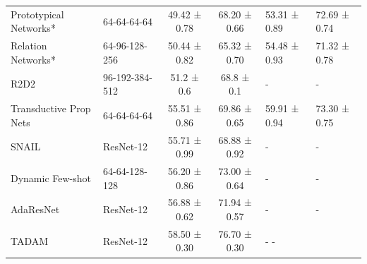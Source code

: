 \begin{table}[htbp]
{\begin{tabular}{
    l 
    l 
    c 
    c 
    l 
    l }
    Prototypical Networks*                           & 64-64-64-64                       & 49.42 ± 0.78                                                      & 68.20 ± 0.66                                                      & 53.31 ± 0.89                                                & 72.69 ± 0.74                                                \\
    Relation Networks*                               & 64-96-128-256                     & 50.44 ± 0.82                                                      & 65.32 ± 0.70                                                      & 54.48 ± 0.93                                                & 71.32 ± 0.78                                                \\
    R2D2                                             & 96-192-384-512                    & 51.2 ± 0.6                                                        & 68.8 ± 0.1                                                        & -                                   & -                                   \\
    Transductive Prop Nets                           & 64-64-64-64                       & 55.51 ± 0.86                                                      & 69.86 ± 0.65                                                      & 59.91 ± 0.94                                                & 73.30 ± 0.75                                                \\
    SNAIL                                            & ResNet-12                         & 55.71 ± 0.99                                                      & 68.88 ± 0.92                                                      & -                                   & -                                   \\
    Dynamic Few-shot                                 & 64-64-128-128                     & 56.20 ± 0.86                                                      & 73.00 ± 0.64                                                      & -                                   & -                                   \\
    AdaResNet                                        & ResNet-12                         & 56.88 ± 0.62                                                      & 71.94 ± 0.57                                                      & -                                   & -                                   \\
    TADAM                                            & ResNet-12                         & 58.50 ± 0.30                                                      & 76.70 ± 0.30                                                      & -             -                                   \\

\end{tabular}}
\end{table}
